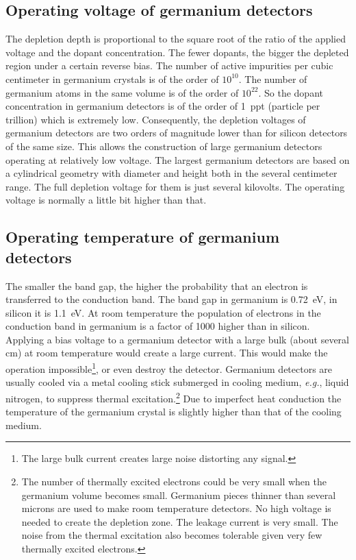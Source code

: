 \subsection{Operating voltage of germanium detectors}
\label{sec:det:volt}
The depletion depth is proportional to the square root of the ratio of the applied voltage and the dopant concentration. The fewer dopants, the bigger the depleted region under a certain reverse bias. The number of active impurities per cubic centimeter in germanium crystals is of the order of $10^{10}$. The number of germanium atoms in the same volume is of the order of $10^{22}$. So the dopant concentration in germanium detectors is of the order of 1~ppt (particle per trillion) which is extremely low. Consequently, the depletion voltages of germanium detectors are two orders of magnitude lower than for silicon detectors of the same size. This allows the construction of large germanium detectors operating at relatively low voltage. The largest germanium detectors are based on a cylindrical geometry with diameter and height both in the several centimeter range. The full depletion voltage for them is just several kilovolts. The operating voltage is normally a little bit higher than that.

\subsection{Operating temperature of germanium detectors}
\label{sec:det:temp}
The smaller the band gap, the higher the probability that an electron is transferred to the conduction band. The band gap in germanium is 0.72~eV, in silicon it is 1.1~eV. At room temperature the population of electrons in the conduction band in germanium is a factor of 1000 higher than in silicon. Applying a bias voltage to a germanium detector with a large bulk (about several cm) at room temperature would create a large current. This would make the operation impossible\footnote{The large bulk current creates large noise   distorting any signal.}, or even destroy the detector. Germanium detectors are usually cooled via a metal cooling stick submerged in cooling medium, \textit{e.g.}, liquid nitrogen, to suppress thermal excitation.\footnote{The number of thermally excited electrons could   be very small when the germanium volume becomes small.  Germanium   pieces thinner than several microns are used to make room   temperature detectors. No high voltage is needed to create the   depletion zone. The leakage current is very small. The noise from   the thermal excitation also becomes tolerable given very few   thermally excited electrons.} Due to imperfect heat conduction the temperature of the germanium crystal is slightly higher than that of the cooling medium.


